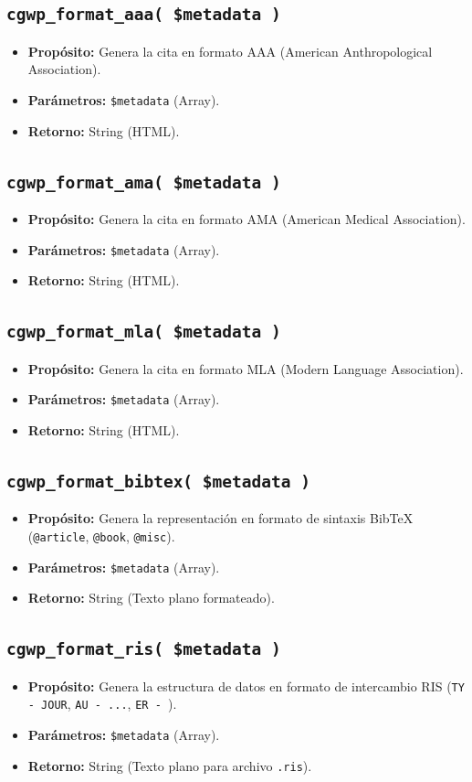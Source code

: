 \documentclass[11pt, a4paper]{article}
\begin{document}
\subsection{\texttt{cgwp\_format\_aaa( \$metadata )}}
\begin{itemize}
\item \textbf{Propósito:} Genera la cita en formato AAA (American Anthropological Association).
\item \textbf{Parámetros:} \texttt{\$metadata} (Array).
\item \textbf{Retorno:} String (HTML).
\end{itemize}
\subsection{\texttt{cgwp\_format\_ama( \$metadata )}}
\begin{itemize}
\item \textbf{Propósito:} Genera la cita en formato AMA (American Medical Association).
\item \textbf{Parámetros:} \texttt{\$metadata} (Array).
\item \textbf{Retorno:} String (HTML).
\end{itemize}
\subsection{\texttt{cgwp\_format\_mla( \$metadata )}}
\begin{itemize}
\item \textbf{Propósito:} Genera la cita en formato MLA (Modern Language Association).
\item \textbf{Parámetros:} \texttt{\$metadata} (Array).
\item \textbf{Retorno:} String (HTML).
\end{itemize}
\subsection{\texttt{cgwp\_format\_bibtex( \$metadata )}}
\begin{itemize}
\item \textbf{Propósito:} Genera la representación en formato de sintaxis BibTeX (\texttt{@article}, \texttt{@book}, \texttt{@misc}).
\item \textbf{Parámetros:} \texttt{\$metadata} (Array).
\item \textbf{Retorno:} String (Texto plano formateado).
\end{itemize}
\subsection{\texttt{cgwp\_format\_ris( \$metadata )}}
\begin{itemize}
\item \textbf{Propósito:} Genera la estructura de datos en formato de intercambio RIS (\texttt{TY  - JOUR}, \texttt{AU  - ...}, \texttt{ER  - }).
\item \textbf{Parámetros:} \texttt{\$metadata} (Array).
\item \textbf{Retorno:} String (Texto plano para archivo \texttt{.ris}).
\end{itemize}
\end{document}
